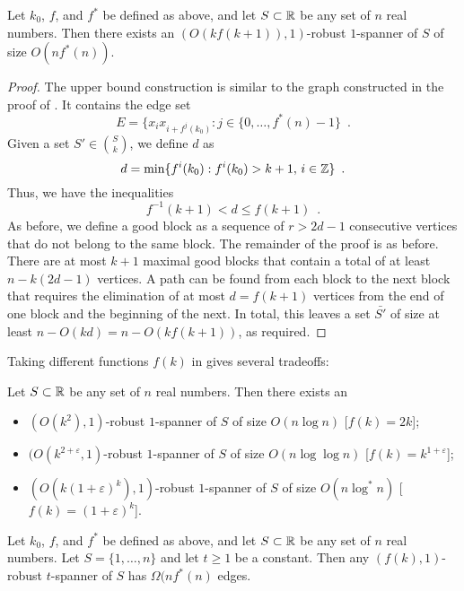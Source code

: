 \documentclass{patmorin}
\begin{document}
\begin{thm}
Let $k_0$, $f$, and $f^*$ be defined as above, and let $S\subset \mathbb{R}$ be
any set of $n$ real numbers.  Then there exists an $(O(kf(k+1)),1)$-robust
$1$-spanner of $S$ of size $O(nf^*(n))$.
\end{thm}

\begin{proof}
The upper bound construction is similar to the graph constructed in the
proof of .  It contains the edge set
\[
    E = \{x_ix_{i+f^{j}(k_0)} : j\in\{0,\ldots,f^*(n)-1\} \enspace .
\] 
Given a set $S'\in \binom{S}{k}$, we define $d$ as
\[
   d=\min\{f^i(k_0) : f^i(k_0)> k+1,\, i\in\mathbb{Z}\} \enspace .
\]
Thus, we have the inequalities
\[
     f^{-1}(k+1) < d \le f(k+1) \enspace .
\]
As before, we define a good block as a sequence of $r>2d-1$ consecutive
vertices that do not belong to the same block.  The remainder of the
proof is as before.   There are at most $k+1$ maximal good blocks that
contain a total of at least $n-k(2d-1)$ vertices.  A path can be found
from each block to the next block that requires the elimination of at
most $d=f(k+1)$ vertices from the end of one block and the beginning of
the next.  In total, this leaves a set $\bar{S'}$ of size at least
$n-O(kd) = n - O(kf(k+1))$, as required.
\end{proof}

Taking different functions $f(k)$ in  gives several tradeoffs:

\begin{cor}
Let $S\subset \mathbb{R}$ be any set of $n$ real numbers.  Then there exists an
\begin{itemize}
  \item $(O(k^2),1)$-robust $1$-spanner of $S$ of size $O(n\log n)$
  [$f(k)=2k$];
  \item $(O(k^{2+\varepsilon},1)$-robust $1$-spanner of $S$ of size
  $O(n\log\log n)$ [$f(k)=k^{1+\varepsilon}$];
  \item $(O(k(1+\varepsilon)^k),1)$-robust $1$-spanner of $S$ of size
  $O(n\log^* n)$ [$f(k)=(1+\varepsilon)^k$].
\end{itemize}
\end{cor}


\begin{thm}
Let $k_0$, $f$, and $f^*$ be defined as above, and let $S\subset \mathbb{R}$
be any set of $n$ real numbers.  Let $S=\{1,\ldots,n\}$ and let $t\ge
1$ be a constant.  Then any $(f(k),1)$-robust $t$-spanner of $S$ has
$\Omega(nf^*(n)$ edges.
\end{thm}
\end{document}
